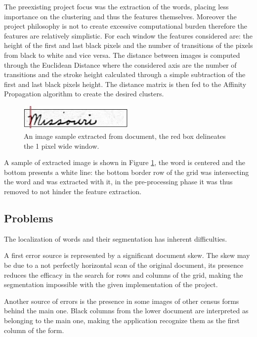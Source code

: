 The preexisting project focus was the extraction of the words, placing less importance on the clustering and thus the features themselves. Moreover the project philosophy is not to create excessive computational burden therefore the features are relatively simplistic. For each window the features considered are: the height of the first and last black pixels and the number of transitions of the pixels from black to white and vice versa.
The distance between images is computed through the Euclidean Distance where the considered axis are the number of transitions and the stroke height calculated through a simple subtraction of the first and last black pixels height.
The distance matrix is then fed to the Affinity Propagation algorithm to create the desired clusters.

\begin{figure}[!ht]
\centering
\vspace{0.3cm}
\includegraphics[width=0.5\textwidth]{images/missouri_1pix.jpg}
\caption{An image sample extracted from document, the red box delineates the 1 pixel wide window.}
\label{fig:extracted_image}
\end{figure}

A sample of extracted image is shown in Figure \ref{fig:extracted_image}, the word is centered and the bottom presents a white line: the bottom border row of the grid was intersecting the word and was extracted with it, in the pre-processing phase it was thus removed to not hinder the feature extraction.

\subsection{Problems}

The localization of words and their segmentation has inherent difficulties.

A first error source is represented by a significant document skew. The skew may be due to a not perfectly horizontal scan of the original document, its presence reduces the efficacy in the search for rows and columns of the grid, making the segmentation impossible with the given implementation of the project.

Another source of errors is the presence in some images of other census forms behind the main one. Black columns from the lower document are interpreted as belonging to the main one, making the application recognize them as the first column of the form.


